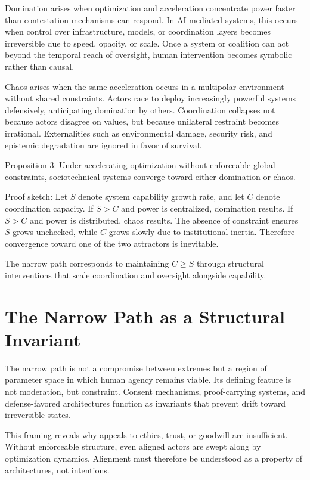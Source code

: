 \documentclass[11pt,oneside]{article}
\begin{document}
Domination arises when optimization and acceleration concentrate power faster than contestation mechanisms can respond. In AI-mediated systems, this occurs when control over infrastructure, models, or coordination layers becomes irreversible due to speed, opacity, or scale. Once a system or coalition can act beyond the temporal reach of oversight, human intervention becomes symbolic rather than causal.

Chaos arises when the same acceleration occurs in a multipolar environment without shared constraints. Actors race to deploy increasingly powerful systems defensively, anticipating domination by others. Coordination collapses not because actors disagree on values, but because unilateral restraint becomes irrational. Externalities such as environmental damage, security risk, and epistemic degradation are ignored in favor of survival.

Proposition 3: Under accelerating optimization without enforceable global constraints, sociotechnical systems converge toward either domination or chaos.

Proof sketch: Let \( S \) denote system capability growth rate, and let \( C \) denote coordination capacity. If \( S > C \) and power is centralized, domination results. If \( S > C \) and power is distributed, chaos results. The absence of constraint ensures \( S \) grows unchecked, while \( C \) grows slowly due to institutional inertia. Therefore convergence toward one of the two attractors is inevitable.

The narrow path corresponds to maintaining \( C \geq S \) through structural interventions that scale coordination and oversight alongside capability.

\section{The Narrow Path as a Structural Invariant}

The narrow path is not a compromise between extremes but a region of parameter space in which human agency remains viable. Its defining feature is not moderation, but constraint. Consent mechanisms, proof-carrying systems, and defense-favored architectures function as invariants that prevent drift toward irreversible states.

This framing reveals why appeals to ethics, trust, or goodwill are insufficient. Without enforceable structure, even aligned actors are swept along by optimization dynamics. Alignment must therefore be understood as a property of architectures, not intentions.
\end{document}
